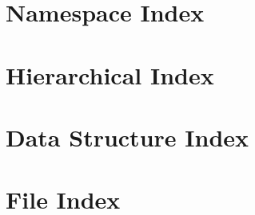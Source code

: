 \documentclass[twoside]{book}
\newcommand{\+}{\discretionary{\mbox{\scriptsize$\hookleftarrow$}}{}{}}
\begin{document}













\chapter{Namespace Index}

\chapter{Hierarchical Index}

\chapter{Data Structure Index}

\chapter{File Index}

\end{document}

